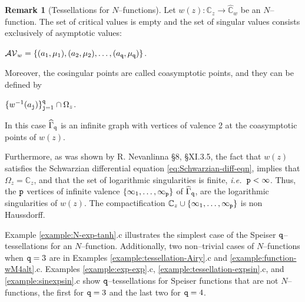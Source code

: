 \documentclass[final,3p,times]{elsarticle}
\newcommand{\CC}{\ensuremath{{\mathbb C}}}
\newcommand{\CW}{\ensuremath{{\widehat{\mathbb C}}}}
\theoremstyle{definition}
\newtheorem{remark}[theorem]{Remark}
\begin{document}
\begin{remark}[Tessellations for $N$--functions]
Let $w(z):\CC_z\longrightarrow\CW_w$ be an $N$--function.
The set of critical values is empty and
the set of singular values consists exclusively of 
asymptotic values:

\centerline{
$\mathcal{AV}_w=\{(a_1, \mu_1), (a_2,\mu_2), \ldots, (a_{\tt q},\mu_{\tt q}) \}$.
}

\noindent
Moreover, the cosingular points are called coasymptotic points, and they can be defined by

\centerline{$\{w^{-1} (a_{\tt j})\}_{{\tt j}=1}^{\tt q} \cap \Omega_z$. }

\noindent
In this case $\widehat{\Gamma}_{\tt q}$ is an infinite graph  with 
vertices of valence 2 at the coasymptotic points of $w(z)$. 

\noindent
Furthermore, 
as was shown by 
R. Nevanlinna \cite{Nevanlinna1} \S 8, 
\cite{Nevanlinna2} \S XI.3.5, 
the fact that $w(z)$ satisfies 
the Schwarzian differential equation 
\eqref{eq:Schwarzian-diff-eqn}, 
implies that $\Omega_z=\CC_z$,
and that the set of logarithmic singularities is finite, \emph{i.e.}\ ${\tt p}<\infty$.
Thus, the ${\tt p}$ vertices of infinite valence $\{\infty_1,\ldots,\infty_{\tt p} \}$ of
$\widehat{\Gamma}_{\tt q}$,
are the logarithmic singularities of $w(z)$.
The compactification 
$\CC_{z} \cup \{\infty_1, \ldots , \infty_{\tt p} \}$
is non Haussdorff. 

\noindent 
Example \ref{example:N-exp-tanh}.c illustrates 
the simplest case of the Speiser $\tt q$--tessellations for  
an $N$--function. 
Additionally, 
two non--trivial cases of $N$--functions when ${\tt q} = 3$ are in
Examples \ref{example:tessellation-Airy}.c and 
\ref{example:function-wM4alt}.c. 
Examples \ref{example:exp-exp}.c, \ref{example:tessellation-expsin}.c,
and \ref{example:sinexpsin}.c show $\tt q$--tessellations 
for Speiser functions that are not $N$--functions, 
the first for ${\tt q}=3$ and the last two for ${\tt q}=4$.
\end{remark}
\end{document}

